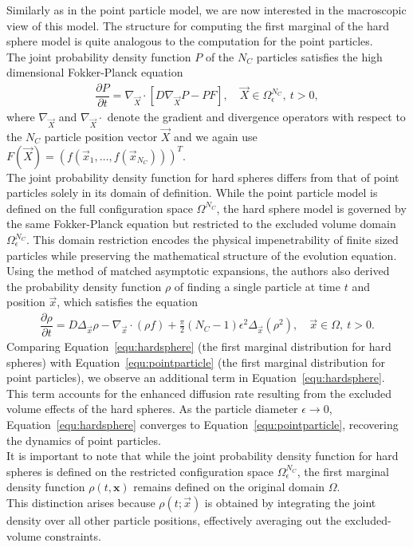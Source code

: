 Similarly as in the point particle model, we are now interested in the macroscopic view of this model. 
The structure for computing the first marginal of the hard sphere model is quite analogous to the computation for the point particles. \\
The joint probability density function $P$ of the $N_C$ particles satisfies the high dimensional Fokker-Planck equation
\begin{align*}
	\dfrac{\partial P}{\partial t} = \nabla_{\vec{X}} \cdot [ D \nabla_{\vec{X}} P - P F], \quad \vec{X} \in \Omega_{\epsilon}^{N_C}, \: t > 0,
\end{align*}
where $\nabla_{\vec{X}}$ and $\nabla_{\vec{X}} \cdot$ denote the gradient and divergence operators with respect to the $N_C$ particle position vector $\vec{X}$ and we again use $F(\vec{X}) = (f(\vec{x}_1, \ldots, f(\vec{x}_{N_C})))^T$. \\
The joint probability density function for hard spheres differs from that of point particles solely in its domain of definition. 
While the point particle model is defined on the full configuration space $\Omega^{N_C}$, the hard sphere model is governed by the same Fokker-Planck equation but restricted to the excluded volume domain $\Omega_{\epsilon}^{N_C}$. 
This domain restriction encodes the physical impenetrability of finite sized particles while preserving the mathematical structure of the evolution equation. \\
Using the method of matched asymptotic expansions, the authors also derived the probability density function $\rho$ of finding a single particle at time $t$ and position $\vec{x}$, which satisfies the equation
\begin{align}
	\dfrac{\partial \rho}{\partial t} = D \Delta_{\vec{x}} \rho - \nabla_{\vec{x}} \cdot (\rho f) + \frac{\pi}{2} (N_C - 1) \epsilon^2 \Delta_{\vec{x}} (\rho^2), \quad \vec{x} \in \Omega, \: t>0 .
	\label{equ:hardsphere}
\end{align}
Comparing Equation~\eqref{equ:hardsphere} (the first marginal distribution for hard spheres) with Equation~\eqref{equ:pointparticle} (the first marginal distribution for point particles), we observe an additional term in Equation~\eqref{equ:hardsphere}. 
This term accounts for the enhanced diffusion rate resulting from the excluded volume effects of the hard spheres. 
As the particle diameter $\epsilon \to 0$, Equation~\eqref{equ:hardsphere} converges to Equation~\eqref{equ:pointparticle}, recovering the dynamics of point particles. \\
It is important to note that while the joint probability density function for hard spheres is defined on the restricted configuration space $\Omega_{\epsilon}^{N_C}$, the first marginal density function $\rho(t, \mathbf{x})$ remains defined on the original domain $\Omega$. \\
This distinction arises because $\rho(t; \vec{x})$ is obtained by integrating the joint density over all other particle positions, effectively averaging out the excluded-volume constraints. 

